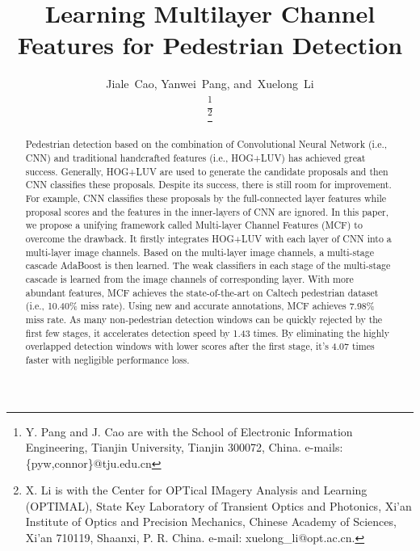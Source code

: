 \documentclass[journal]{IEEEtran}
\begin{document}
\title{Learning Multilayer Channel Features for Pedestrian Detection}




\author{Jiale~Cao,
        Yanwei~Pang,
        and~Xuelong~Li


\thanks{Y. Pang and J. Cao are with the School of Electronic Information Engineering, Tianjin University, Tianjin 300072, China. e-mails: \{pyw,connor\}@tju.edu.cn}

\thanks{X. Li is with the Center for OPTical IMagery Analysis and Learning (OPTIMAL), State Key Laboratory of Transient Optics and Photonics, Xi'an Institute of Optics and Precision Mechanics, Chinese Academy of Sciences, Xi'an 710119, Shaanxi, P. R. China. e-mail: xuelong\_li@opt.ac.cn.}}




















\maketitle

\begin{abstract}
Pedestrian detection based on the combination of Convolutional Neural Network (i.e., CNN) and traditional handcrafted features (i.e., HOG+LUV) has achieved great success. Generally, HOG+LUV are used to generate the candidate proposals and then CNN classifies these proposals. Despite its success, there is still room for improvement. For example, CNN classifies these proposals by the full-connected layer features while proposal scores and the features in the inner-layers of CNN are ignored. In this paper, we propose a unifying framework called Multi-layer Channel Features (MCF) to overcome the drawback. It firstly integrates HOG+LUV with each layer of CNN into a multi-layer image channels. Based on the multi-layer image channels, a multi-stage cascade AdaBoost is then learned. The weak classifiers in each stage of the multi-stage cascade is learned from the  image channels of corresponding layer. With more abundant features, MCF achieves the state-of-the-art on Caltech pedestrian dataset (i.e., 10.40\% miss rate). Using new and accurate annotations, MCF achieves 7.98\% miss rate. As many non-pedestrian detection windows can be quickly rejected by the first few stages, it accelerates detection speed by 1.43 times. By eliminating the highly overlapped detection windows with lower scores after the first stage, it's 4.07 times faster with negligible performance loss.
\end{abstract}
\end{document}
